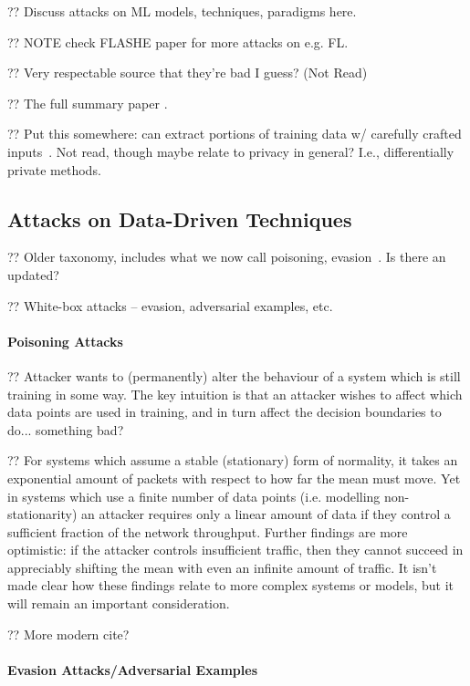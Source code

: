 
?? Discuss attacks on ML models, techniques, paradigms here.

?? NOTE check FLASHE paper for more attacks on e.g. FL.

?? Very respectable source \cite{DBLP:conf/eurosp/PapernotMJFCS16} that they're bad I guess? (Not Read)

?? The full summary paper \cite{DBLP:conf/eurosp/PapernotMSW18}.

?? Put this somewhere: can extract portions of training data w/ carefully crafted inputs~\parencite{DBLP:journals/corr/abs-2012-07805}. Not read, though maybe relate to privacy in general? I.e., differentially private methods.

\subsection{Attacks on Data-Driven Techniques}\label{sec:attacks-on-data-driven-techniques}

?? Older taxonomy, includes what we now call poisoning, evasion~\cite{DBLP:conf/ccs/BarrenoNSJT06}. Is there an updated?

?? White-box attacks -- evasion, adversarial examples, etc.

\paragraph{Poisoning Attacks}
?? Attacker wants to (permanently) alter the behaviour of a system which is still training in some way.
The key intuition is that an attacker wishes to affect which data points are used in training, and in turn affect the decision boundaries to do... something bad?

?? For systems which assume a stable (stationary) form of normality, it takes an exponential amount of packets with respect to how far the mean must move.
Yet in systems which use a finite number of data points (i.e. modelling non-stationarity) an attacker requires only a linear amount of data if they control a sufficient fraction of the network throughput.
Further findings are more optimistic: if the attacker controls insufficient traffic, then they cannot succeed in appreciably shifting the mean with even an infinite amount of traffic.
It isn't made clear how these findings relate to more complex systems or models, but it will remain an important consideration. \cite{DBLP:journals/jmlr/KloftL10}

?? More modern cite?

\paragraph{Evasion Attacks/Adversarial Examples}

